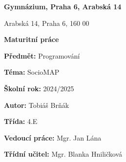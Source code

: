 \begin{titlepage}

\vspace{1.5cm}

\begin{center}
    {\LARGE \textbf{ Gymnázium, Praha 6, Arabská 14}}

    \vspace{1.0cm}

    {\Large Arabská 14, Praha 6, 160 00}

    \vspace{3.5cm}
 
    {\Huge \textbf{Maturitní práce}}
\end{center}

\vspace{6.0cm}

\textbf{Předmět:} {\large Programování}

\textbf{Téma:} {\large SocioMAP}

\vspace{1.5cm}

\textbf{Školní rok:}  {\large2024/2025 }


\textbf{Autor:} {\large Tobiáš Brňák}


\textbf{Třída:} {\large 4.E}


\textbf{Vedoucí práce:} {\large Mgr. Jan Lána}


\textbf{Třídní učitel:} {\large Mgr. Blanka Hniličková}

\end{titlepage}